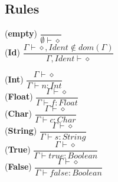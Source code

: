\documentclass[12pt]{article}
\begin{document}
\subsection*{Rules}
\begin{center}
\noindent (\textbf{empty})
$\dfrac{}{\emptyset \vdash \diamond}$\\[0.2in]
\noindent (\textbf{Id})
$\dfrac{\Gamma \vdash \diamond , Ident \not\in dom(\Gamma)}{\Gamma , Ident \vdash \diamond}$\\[0.1in]
\end{center}

\begin{center}
\noindent(\textbf{Int})
$\dfrac{\Gamma \vdash \diamond}{\Gamma \vdash n : Int}$\\[0.1in]
\noindent(\textbf{Float})
$\dfrac{\Gamma \vdash \diamond}{\Gamma \vdash f : Float}$\\[0.1in]
\noindent(\textbf{Char})
$\dfrac{\Gamma \vdash \diamond}{\Gamma \vdash c : Char}$\\[0.1in]
\noindent(\textbf{String})
$\dfrac{\Gamma \vdash \diamond}{\Gamma \vdash s : String}$\\[0.1in]
\noindent(\textbf{True})
$\dfrac{\Gamma \vdash \diamond}{\Gamma \vdash true : Boolean}$\\[0.1in]
\noindent(\textbf{False})
$\dfrac{\Gamma \vdash \diamond}{\Gamma \vdash false : Boolean}$\\[0.1in]
\end{center}
\end{document}
